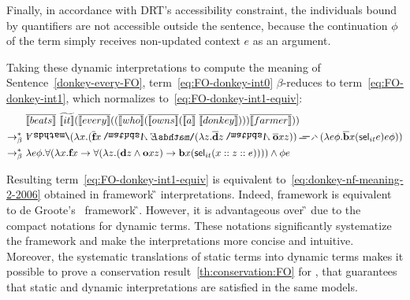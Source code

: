 {Finally, in accordance with DRT's accessibility constraint, the individuals bound by quantifiers are not accessible outside the sentence, because the continuation $\phi$ of the term simply receives non-updated context $e$ as an argument.






 Taking these dynamic interpretations to compute the meaning of Sentence~\eqref{donkey-every-FO}, term~\eqref{eq:FO-donkey-int0} $\beta$-reduces to term~\eqref{eq:FO-donkey-int1}, which normalizes to~\eqref{eq:FO-donkey-int1-equiv}:
\begin{align}
& \tr{\I{beats}}  \ \etr{\I{it}} (\tr{\I{every}}  ((\tr{\I{who}}  (\tr{\I{owns}}  (\tr{\I{a}} \ \tr{\I{donkey}} ) ) ) \tr{\I{farmer}}  ))  \label{eq:FO-donkey-int0} \\
\bred \ &  \all2 (\lambda \x1. (\tr{\textbf{f}} \x1  \cnj2     \ex2 (\lambda \z1.   \tr{\textbf{d}}   \z1  \cnj2      \tr{\textbf{o}}  \x1  \z1 ))    \impK2    (\lambda e \phi. \tr{\textbf{b}}  \x1 ( \selK_{it} e ) e \phi ) )  \label{eq:FO-donkey-int1} \\
\bred \ & \lambda e \phi. \forall (\lambda \x1. \cfarmer \x1  \rightarrow \forall  (\lambda \z1.  (\cdonkey  \z1 \land \cown  \x1 \z1 )   \rightarrow  \cbeat  \x1 ( \selK_{it}  (\upii{\x1}{\upii{\z1}{e}}) )))\land \phi e  \label{eq:FO-donkey-int1-equiv}
\end{align}


Resulting term~\eqref{eq:FO-donkey-int1-equiv} is equivalent to~\eqref{eq:donkey-nf-meaning-2-2006} obtained in framework {\G} interpretations. Indeed, framework {\GN} is equivalent to de Groote's~\cite{deGroote:2006:Towards-a-Montagovian-Account-of-Dynamics} framework {\G}. However, it is advantageous over {\G} due to the compact notations for dynamic terms. These notations significantly systematize the framework and make the interpretations more concise and intuitive. Moreover, the systematic translations of static terms into dynamic terms makes it possible to prove a conservation result~\ref{th:conservation:FO} for {\GN}, that guarantees that static and dynamic interpretations are satisfied in the same models. 

}


